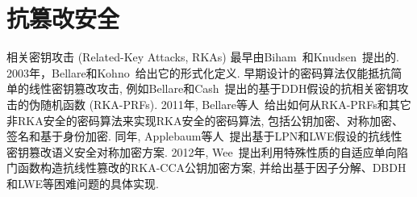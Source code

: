 \section{抗篡改安全}

相关密钥攻击 (Related-Key Attacks, RKAs) 最早由Biham~\cite{Biham-JOC-1994}和Knudsen~\cite{Knudsen-AUSCRYPT-1992}提出的. 2003年，Bellare和Kohno~\cite{BK-EUROCRYPT-2003}给出它的形式化定义. 早期设计的密码算法仅能抵抗简单的线性密钥篡改攻击, 例如Bellare和Cash~\cite{BC-CRYPTO-2010}提出的基于DDH假设的抗相关密钥攻击的伪随机函数 (RKA-PRFs). 2011年, Bellare等人~\cite{BCM-ASIACRYPT-2011}给出如何从RKA-PRFs和其它非RKA安全的密码算法来实现RKA安全的密码算法, 包括公钥加密、对称加密、签名和基于身份加密. 同年, Applebaum等人~\cite{AHI-ITCS-2011}提出基于LPN和LWE假设的抗线性密钥篡改语义安全对称加密方案. 2012年, Wee~\cite{Wee-EUROCRYPT-2012}提出利用特殊性质的自适应单向陷门函数构造抗线性篡改的RKA-CCA公钥加密方案, 并给出基于因子分解、DBDH和LWE等困难问题的具体实现. 

